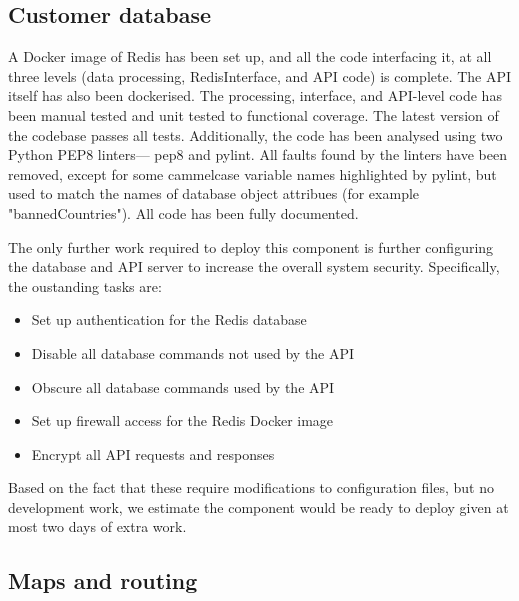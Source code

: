 \subsection{Customer database}
\begin{flushleft}
A Docker image of Redis has been set up, and all the code interfacing it, at all three levels (data processing, RedisInterface, and API code) is complete. The API itself has also been dockerised. The processing, interface, and API-level code has been manual tested and unit tested to functional coverage. The latest version of the codebase passes all tests. Additionally, the code has been analysed using two Python PEP8 linters--- pep8 and pylint. All faults found by the linters have been removed, except for some cammelcase variable names highlighted by pylint, but used to match the names of database object attribues (for example "bannedCountries"). All code has been fully documented.
\end{flushleft}
\begin{flushleft}
The only further work required to deploy this component is further configuring the database and API server to increase the overall system security. Specifically, the oustanding tasks are:
\end{flushleft}
\begin{itemize}
    \item Set up authentication for the Redis database
    \item Disable all database commands not used by the API
    \item Obscure all database commands used by the API
    \item Set up firewall access for the Redis Docker image
    \item Encrypt all API requests and responses
\end{itemize}
\begin{flushleft}
Based on the fact that these require modifications to configuration files, but no development work, we estimate the component would be ready to deploy given at most two days of extra work.
\end{flushleft}

\subsection{Maps and routing}

